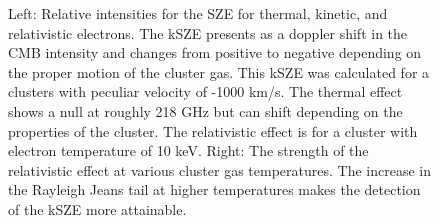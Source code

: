 \documentclass[manuscript]{aastex}
\begin{document}
\begin{figure}[!ht]%
    \centering
    \qquad
    \singlespace
    \caption[Intensities of the kSZE, tSZE, and rSZE for simulated galaxy cluster.]{Left: Relative intensities for the SZE for thermal, kinetic, and relativistic electrons. The kSZE presents as a doppler shift in the CMB intensity and changes from positive to negative depending on the proper motion of the cluster gas. This kSZE was calculated for a clusters with peculiar velocity of -1000 km/s. The thermal effect shows a null at roughly 218 GHz but can shift depending on the properties of the cluster. The relativistic effect is for a cluster with electron temperature of 10 keV. Right: The strength of the relativistic effect at various cluster gas temperatures. The increase in the Rayleigh Jeans tail at higher temperatures makes the detection of the kSZE more attainable.}%
    \label{fig:tksze}%
\end{figure}
\end{document}
